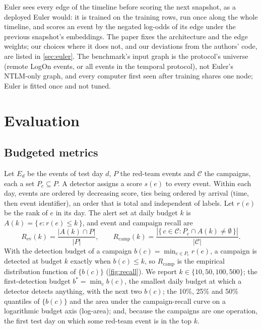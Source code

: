 \documentclass[11pt,a4paper]{article}
\newcommand{\Rcamp}{R_{\mathrm{camp}}}
\newcommand{\Rev}{R_{\mathrm{ev}}}
\begin{document}
Euler sees every edge of the timeline before scoring the next snapshot, as a deployed Euler would: it is trained on the training rows, run once along the whole timeline, and scores an event by the negated log-odds of its edge under the previous snapshot's embeddings. The paper fixes the architecture and the edge weights; our choices where it does not, and our deviations from the authors' code, are listed in \cref{sec:euler}. The benchmark's input graph is the protocol's universe (remote LogOn events, or all events in the temporal protocol), not Euler's NTLM-only graph, and every computer first seen after training shares one node; Euler is fitted once and not tuned.

\section{Evaluation}
\label{sec:evaluation}

\subsection{Budgeted metrics}
Let $E_d$ be the events of test day $d$, $P$ the red-team events and $\mathcal{C}$ the campaigns, each a set $P_c \subseteq P$. A detector assigns a score $s(e)$ to every event. Within each day, events are ordered by decreasing score, ties being ordered by arrival (time, then event identifier), an order that is total and independent of labels. Let $r(e)$ be the rank of $e$ in its day. The alert set at daily budget $k$ is $A(k) = \{\, e : r(e) \le k \,\}$, and event and campaign recall are
\begin{equation}
\Rev(k) = \frac{|A(k) \cap P|}{|P|}, \qquad
\Rcamp(k) = \frac{|\{\, c \in \mathcal{C} : P_c \cap A(k) \neq \emptyset \,\}|}{|\mathcal{C}|}.
\end{equation}
With the detection budget of a campaign $b(c) = \min_{e \in P_c} r(e)$, a campaign is detected at budget $k$ exactly when $b(c) \le k$, so $\Rcamp$ is the empirical distribution function of $\{b(c)\}$ (\cref{fig:recall}). We report $k \in \{10, 50, 100, 500\}$; the first-detection budget $b^{*} = \min_{c} b(c)$, the smallest daily budget at which a detector detects anything, with the next two $b(c)$; the 10\%, 25\% and 50\% quantiles of $\{b(c)\}$ and the area under the campaign-recall curve on a logarithmic budget axis (log-area); and, because the campaigns are one operation, the first test day on which some red-team event is in the top $k$.
\end{document}
